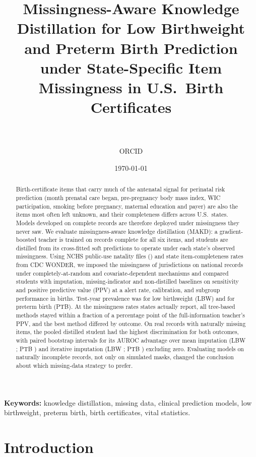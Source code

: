 \documentclass[11pt]{article}
\title{Missingness-Aware Knowledge Distillation for Low Birthweight and Preterm Birth Prediction under State-Specific Item Missingness in U.S.\ Birth Certificates}
\author{\AuthorName\\ \AuthorAff\\ \small ORCID \AuthorOrcid\\ \small \href{mailto:\AuthorEmail}{\AuthorEmail}}
\date{\today}
\begin{document}
\maketitle

\begin{abstract}
Birth-certificate items that carry much of the antenatal signal for perinatal risk prediction (month prenatal care began, pre-pregnancy body mass index, WIC participation, smoking before pregnancy, maternal education and payer) are also the items most often left unknown, and their completeness differs across U.S.\ states. Models developed on complete records are therefore deployed under missingness they never saw. We evaluate missingness-aware knowledge distillation (MAKD): a gradient-boosted teacher is trained on records complete for all six items, and students are distilled from its cross-fitted soft predictions to operate under each state's observed missingness. Using NCHS public-use natality files (\YearsAll) and state item-completeness rates from CDC WONDER, we imposed the missingness of \NStates{} jurisdictions on national records under completely-at-random and covariate-dependent mechanisms and compared students with imputation, missing-indicator and non-distilled baselines on sensitivity and positive predictive value (PPV) at a \AlertPct{} alert rate, calibration, and subgroup performance in \TestYear{} births. Test-year prevalence was \PrevLBW{} for low birthweight (LBW) and \PrevPTB{} for preterm birth (PTB). At the missingness rates states actually report, all tree-based methods stayed within a fraction of a percentage point of the full-information teacher's PPV, and the best method differed by outcome. On \NaturalN{} real \TestYear{} records with naturally missing items, the pooled distilled student had the highest discrimination for both outcomes, with paired bootstrap intervals for its AUROC advantage over mean imputation (LBW \LBWNatAucOne; PTB \PTBNatAucOne) and iterative imputation (LBW \LBWNatAucTwo; PTB \PTBNatAucTwo) excluding zero. Evaluating models on naturally incomplete records, not only on simulated masks, changed the conclusion about which missing-data strategy to prefer.
\end{abstract}

\noindent\textbf{Keywords:} knowledge distillation, missing data, clinical prediction models, low birthweight, preterm birth, birth certificates, vital statistics.

\section{Introduction}
\end{document}
